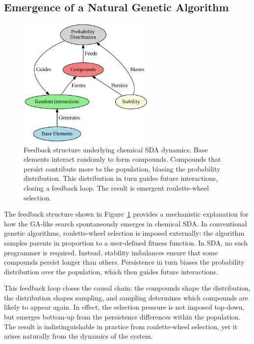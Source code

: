 \documentclass[life,article,submit,pdftex,moreauthors]{Definitions/mdpi}
\begin{document}
\subsection{Emergence of a Natural Genetic Algorithm}

\begin{figure}[H]
    \centering
    \includegraphics[width=0.6\textwidth]{SDA-top-down.png}
    \caption{Feedback structure underlying chemical SDA dynamics. Base elements interact randomly to form compounds. Compounds that persist contribute more to the population, biasing the probability distribution. This distribution in turn guides future interactions, closing a feedback loop. The result is emergent roulette-wheel selection.}
    \label{fig:top-down}
\end{figure}

The feedback structure shown in Figure~\ref{fig:top-down} provides a mechanistic explanation for how the GA-like search spontaneously emerges in chemical SDA. In conventional genetic algorithms, roulette-wheel selection is imposed externally: the algorithm samples parents in proportion to a user-defined fitness function. In SDA, no such programmer is required. Instead, stability imbalances ensure that some compounds persist longer than others. Persistence in turn biases the probability distribution over the population, which then guides future interactions. 

This feedback loop closes the causal chain: the compounds shape the distribution, the distribution shapes sampling, and sampling determines which compounds are likely to appear again. In effect, the selection pressure is not imposed top-down, but emerges bottom-up from the persistence differences within the population. The result is indistinguishable in practice from roulette-wheel selection, yet it arises naturally from the dynamics of the system.
\end{document}
